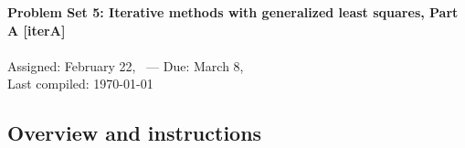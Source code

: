\documentclass[11pt,titlepage,fleqn]{article}
\begin{document}
 

\begin{spacing}{1.2}
\centering
{\large \bf Problem Set 5: Iterative methods with generalized least squares, Part A [iterA]} \\
\cltag\ \\
Assigned: February 22, \cyear\ --- Due: March 8, \cyear\ \\
Last compiled: \today
\end{spacing}


\subsection*{Overview and instructions}
\end{document}
